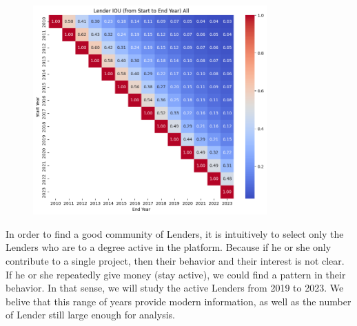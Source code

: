 \begin{figure}[H]
	\centering
	\includegraphics[width=0.8\textwidth]{images/active-fromto.png}
	\caption{}
	\label{fig:active-fromto}
\end{figure}

In order to find a good community of Lenders,
it is intuitively to select only the Lenders who are to a degree active in the platform.
Because if he or she only contribute to a single project,
then their behavior and their interest is not clear.
If he or she repeatedly give money (stay active),
we could find a pattern in their behavior.
In that sense, we will study the active Lenders from 2019 to 2023.
We belive that this range of years provide modern information,
as well as the number of Lender still large enough for analysis.
